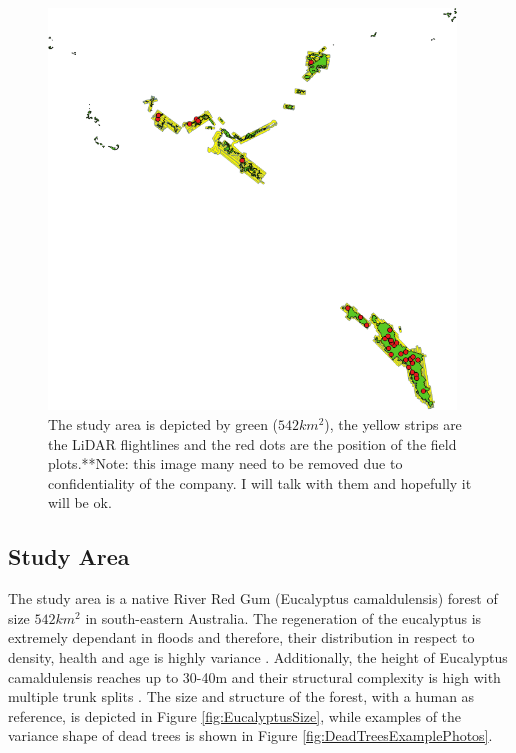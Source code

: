 \documentclass{subfiles}
\begin{document}
	\begin{figure} [h!]
		\centering
		\begin{framed}
		\includegraphics[width=0.965\textwidth]{img/dead/StudyArea}
	  	\end{framed}
		\caption{The study area is depicted by green ($542km^2$), the yellow strips are the LiDAR flightlines and the red dots are the position of the field plots.{\color{red}**Note: this image many need to be removed due to confidentiality of the company. I will talk with them and hopefully it will be ok.}}
		\label{fig:StudyArea}
	\end{figure}

\subsection{Study Area} \label{sec:StudyArea}

The study area is a native River Red Gum (Eucalyptus camaldulensis) forest  of size $542km^2$ in south-eastern Australia. The regeneration of the eucalyptus is extremely dependant in floods and therefore, their distribution in respect to density, health and age is highly variance \cite{Kerle2005}. Additionally, the height of Eucalyptus camaldulensis reaches up to 30-40m and their structural complexity is high with multiple trunk splits \cite{Wilson1995}. The size and structure of the forest, with a human as reference, is depicted in Figure \ref{fig:EucalyptusSize}, while examples of the variance shape of dead trees is shown in Figure \ref{fig:DeadTreesExamplePhotos}. 
\end{document}
